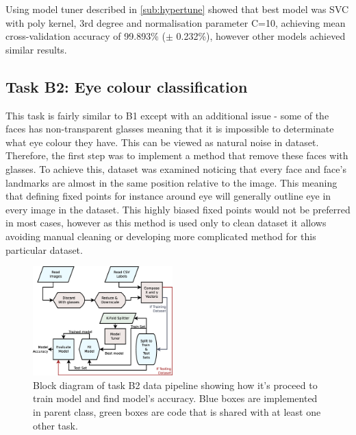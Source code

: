 \documentclass{article}
\begin{document}
Using model tuner described in \autoref{sub:hypertune} showed that best model was SVC with poly kernel, 3rd degree and normalisation parameter C=10, achieving mean cross-validation accuracy of 99.893\% ($\pm$ 0.232\%), however other models achieved similar results. 


\subsection{Task B2: Eye colour classification}

This task is fairly similar to B1 except with an additional issue - some of the faces has non-transparent glasses meaning that it is impossible to determinate what eye colour they have. This can be viewed as natural noise in dataset. Therefore, the first step was to implement a method that remove these faces with glasses. To achieve this, dataset was examined noticing that every face and face's landmarks are almost in the same position relative to the image. This meaning that defining fixed points for instance around eye will generally outline eye in every image in the dataset. This highly biased fixed points would not be preferred in most cases, however as this method is used only to clean dataset it allows avoiding manual cleaning or developing more complicated method for this particular dataset. 

\begin{figure}[htb]
	\centering
	\includegraphics[width=0.48\textwidth]{graphics/B2_diagram.eps}
	\caption{Block diagram of task B2 data pipeline showing how it's proceed to train model and find model's accuracy. Blue boxes are implemented in parent class, green boxes are code that is shared with at least one other task.}
	\label{fig:block_b2}
\end{figure}
\end{document}
